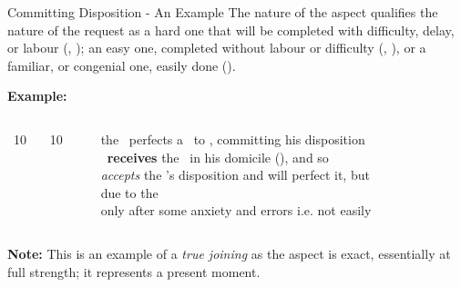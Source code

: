 \begin{frame}[t]{Committing Disposition - An Example}
The nature of the aspect qualifies the nature of the request as a hard one that will be completed with difficulty, delay, or labour (\Square, \Opposition); an easy one, completed without labour or difficulty (\Sextile, \Trine), or a familiar, or congenial one, easily done (\Conjunction).

\textbf{Example:}
\begin{columns}[T, onlytextwidth]
\Sun\ 10 \Aries\ \Square\ \Mars\ 10 \Capricorn

\rule{.1mm}{.25\textheight}

the \Sun\ perfects a \Square\  to \Mars, committing his disposition \\
\Mars\ \textbf{receives} the \Sun\ in his domicile (\Aries), and so \\
\textsl{accepts} the \Sun's disposition and will perfect it, but \\
due to the \Square\, \\ 
only after some anxiety and errors i.e. not easily
\end{columns}
\vspace{0.5cm}
\textbf{Note:} This is an example of a \textsl{true joining} as the aspect is exact, essentially at full strength; it represents a present moment.

\end{frame}
